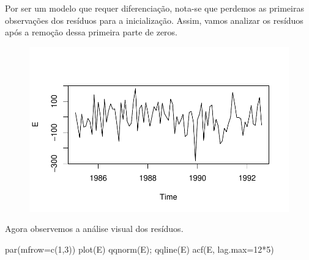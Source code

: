 \documentclass[
  letterpaper,
  DIV=11,
  numbers=noendperiod]{scrartcl}
\newenvironment{Shaded}{\begin{snugshade}}{\end{snugshade}}
\newcommand{\AttributeTok}[1]{\textcolor[rgb]{0.40,0.45,0.13}{#1}}
\newcommand{\CommentTok}[1]{\textcolor[rgb]{0.37,0.37,0.37}{#1}}
\newcommand{\DecValTok}[1]{\textcolor[rgb]{0.68,0.00,0.00}{#1}}
\newcommand{\FunctionTok}[1]{\textcolor[rgb]{0.28,0.35,0.67}{#1}}
\newcommand{\NormalTok}[1]{\textcolor[rgb]{0.00,0.23,0.31}{#1}}
\newcommand{\OtherTok}[1]{\textcolor[rgb]{0.00,0.23,0.31}{#1}}
\newcommand{\SpecialCharTok}[1]{\textcolor[rgb]{0.37,0.37,0.37}{#1}}
\begin{document}
Por ser um modelo que requer diferenciação, nota-se que perdemos as
primeiras observações dos resíduos para a inicialização. Assim, vamos
analizar os resíduos após a remoção dessa primeira parte de zeros.

\begin{Shaded}
\end{Shaded}

\begin{figure}[H]

{\centering \includegraphics{Trabalhao1_ST_grupo5_2023_05_16_files/figure-pdf/unnamed-chunk-14-1.pdf}

}

\end{figure}

Agora observemos a análise visual dos resíduos.

\begin{Shaded}
\begin{Highlighting}[]
\FunctionTok{par}\NormalTok{(}\AttributeTok{mfrow=}\FunctionTok{c}\NormalTok{(}\DecValTok{1}\NormalTok{,}\DecValTok{3}\NormalTok{))}
\FunctionTok{plot}\NormalTok{(E)}
\FunctionTok{qqnorm}\NormalTok{(E); }\FunctionTok{qqline}\NormalTok{(E)}
\FunctionTok{acf}\NormalTok{(E, }\AttributeTok{lag.max=}\DecValTok{12}\SpecialCharTok{*}\DecValTok{5}\NormalTok{)}
\end{Highlighting}
\end{Shaded}
\end{document}
